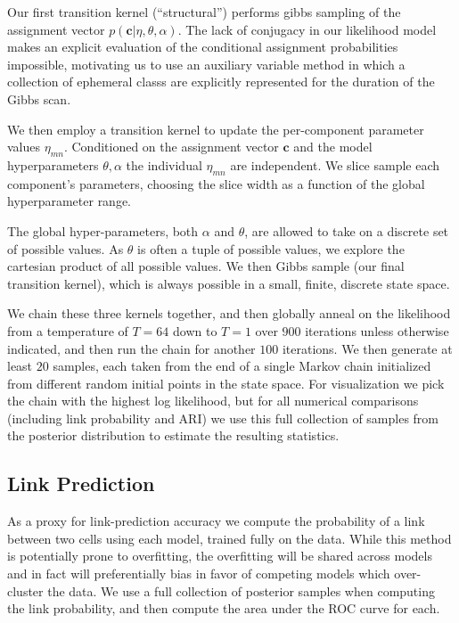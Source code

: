 \documentclass{article}
\renewcommand{\vec}[1]{\mathbf{#1}}
\begin{document}
Our first transition kernel (``structural'') performs gibbs sampling 
of the assignment vector $p(\vec{c} | \eta, \theta, \alpha)$. 
The lack of conjugacy in our likelihood model makes an explicit 
evaluation of the conditional assignment probabilities impossible, 
motivating us to use an auxiliary variable method \autocite{Neal2000}
in which a collection of ephemeral classs are explicitly represented
for the duration of the Gibbs scan. 

We then employ a transition kernel to update the per-component
parameter values $\eta_{mn}$. Conditioned on the assignment vector
$\vec{c}$ and the model hyperparameters $\theta, \alpha$ the 
individual $\eta_{mn}$ are independent. We slice sample \autocite{Neal2003}
each component's parameters, choosing the slice width as a function
of the global hyperparameter range. 

The global hyper-parameters, both $\alpha$ and $\theta$, are allowed
to take on a discrete set of possible values. As $\theta$ is often a
tuple of possible values, we explore the cartesian product of all
possible values. We then Gibbs sample (our final transition kernel),
which is always possible in a small, finite, discrete state space.

We chain these three kernels together, and then globally anneal on the
likelihood from a temperature of $T=64$ down to $T=1$ over $900$
iterations unless otherwise indicated, and then run the chain for
another $100$ iterations. We then generate at least $20$ samples, each
taken from the end of a single Markov chain initialized from different
random initial points in the state space. For visualization we pick the
chain with the highest log likelihood, but for all numerical
comparisons (including link probability and ARI) we use this full
collection of samples from the posterior distribution to estimate the
resulting statistics.

\subsection{Link Prediction}
As a proxy for link-prediction accuracy we compute the probability of a link
between two cells using each model, trained fully on the data. While this method
is potentially prone to overfitting, the overfitting will be shared across models
and in fact will preferentially bias in favor of competing models
which over-cluster the data. We use a full collection of posterior samples when
computing the link probability, and then compute the area under the ROC curve for
each. 
\end{document}
